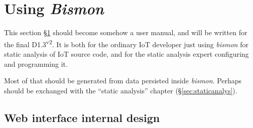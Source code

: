 \section{Using \emph{Bismon}}
\label{sec:using}

This section §\ref{sec:using} should become somehow a user manual, and
will be written for the final D1.3\textsuperscript{v2}. It is both for
the ordinary IoT developer just using \emph{bismon} for static
analysis of IoT source code, and for the static analysis expert
configuring and programming it.

Most of that should be generated from data persisted inside \emph{bismon}. Perhaps
should be exchanged with the ``static analysis'' chapter
(§\ref{sec:staticanalys}).




\subsection{Web interface internal design}
\label{subsec:webinterf}

